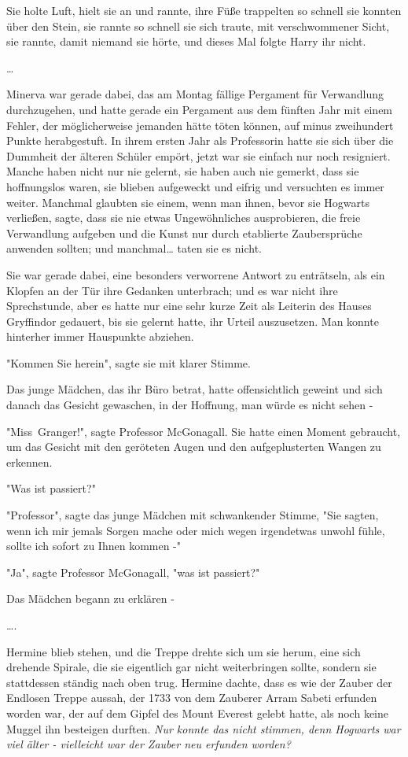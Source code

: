 {Sie holte Luft, hielt sie an und rannte, ihre Füße trappelten so schnell sie konnten über den Stein, sie rannte so schnell sie sich traute, mit verschwommener Sicht, sie rannte, damit niemand sie hörte, und dieses Mal folgte Harry ihr nicht.

…

Minerva war gerade dabei, das am Montag fällige Pergament für Verwandlung durchzugehen, und hatte gerade ein Pergament aus dem fünften Jahr mit einem Fehler, der möglicherweise jemanden hätte töten können, auf minus zweihundert Punkte herabgestuft. In ihrem ersten Jahr als Professorin hatte sie sich über die Dummheit der älteren Schüler empört, jetzt war sie einfach nur noch resigniert. Manche haben nicht nur nie gelernt, sie haben auch nie gemerkt, dass sie hoffnungslos waren, sie blieben aufgeweckt und eifrig und versuchten es immer weiter. Manchmal glaubten sie einem, wenn man ihnen, bevor sie Hogwarts verließen, sagte, dass sie nie etwas Ungewöhnliches ausprobieren, die freie Verwandlung aufgeben und die Kunst nur durch etablierte Zaubersprüche anwenden sollten; und manchmal… taten sie es nicht.

Sie war gerade dabei, eine besonders verworrene Antwort zu enträtseln, als ein Klopfen an der Tür ihre Gedanken unterbrach; und es war nicht ihre Sprechstunde, aber es hatte nur eine sehr kurze Zeit als Leiterin des Hauses Gryffindor gedauert, bis sie gelernt hatte, ihr Urteil auszusetzen. Man konnte hinterher immer Hauspunkte abziehen.

"Kommen Sie herein", sagte sie mit klarer Stimme.

Das junge Mädchen, das ihr Büro betrat, hatte offensichtlich geweint und sich danach das Gesicht gewaschen, in der Hoffnung, man würde es nicht sehen -

"Miss~Granger!", sagte Professor McGonagall. Sie hatte einen Moment gebraucht, um das Gesicht mit den geröteten Augen und den aufgeplusterten Wangen zu erkennen.

"Was ist passiert?"

"Professor", sagte das junge Mädchen mit schwankender Stimme, "Sie sagten, wenn ich mir jemals Sorgen mache oder mich wegen irgendetwas unwohl fühle, sollte ich sofort zu Ihnen kommen -"

"Ja", sagte Professor McGonagall, "was ist passiert?"

Das Mädchen begann zu erklären -

….

Hermine blieb stehen, und die Treppe drehte sich um sie herum, eine sich drehende Spirale, die sie eigentlich gar nicht weiterbringen sollte, sondern sie stattdessen ständig nach oben trug. Hermine dachte, dass es wie der Zauber der Endlosen Treppe aussah, der 1733 von dem Zauberer Arram Sabeti erfunden worden war, der auf dem Gipfel des Mount Everest gelebt hatte, als noch keine Muggel ihn besteigen durften. \emph{Nur konnte das nicht stimmen, denn Hogwarts war viel älter - vielleicht war der Zauber neu erfunden worden?}

}
